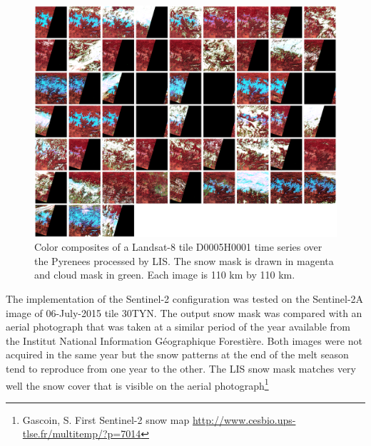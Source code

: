 \documentclass[a4paper]{article}
\begin{document}
\begin{figure}[h]
 \centering
 \includegraphics[width=\textwidth]{./images/montage_L8CESneige.png}
 \caption{Color composites of a Landsat-8 tile D0005H0001 time series over the Pyrenees processed by LIS. The snow mask is drawn in magenta and cloud mask in green. Each image is 110 km by 110 km.}
 \label{fig:L8montage}
\end{figure}

The implementation of the Sentinel-2 configuration was tested on the Sentinel-2A image of 06-July-2015 tile 30TYN. The output snow mask was compared with an aerial photograph that was taken at a similar period of the year available from the Institut National Information Géographique Forestière. Both images were not acquired in the same year but the snow patterns at the end of the melt season tend to reproduce from one year to the other. The LIS snow mask matches very well the snow cover that is visible on the aerial photograph\footnote{Gascoin, S. First Sentinel-2 snow map \url{http://www.cesbio.ups-tlse.fr/multitemp/?p=7014}}
\end{document}
